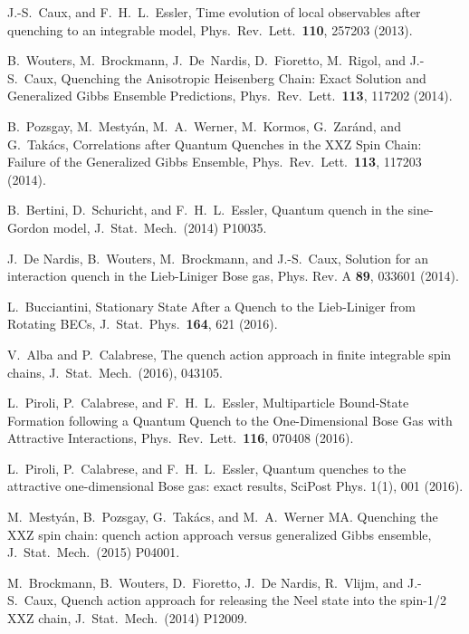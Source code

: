 \documentclass[twocolumn,superscriptaddress,prb,10pt]{revtex4-1}
\begin{document}
\begin{thebibliography}{99}
	J.-S.~Caux, and F.~H.~L.~Essler,  Time evolution of local observables 
	after quenching to an integrable model, Phys.\ Rev.\ Lett.\ {\bf 110}, 257203 (2013). 

	B.~Wouters, M.~Brockmann, J.~De~Nardis, D.~Fioretto, M.~Rigol, and J.-S.~Caux, 
	Quenching the Anisotropic Heisenberg Chain: Exact Solution and Generalized Gibbs Ensemble Predictions, 
	Phys.\ Rev.\ Lett.\ {\bf 113}, 117202 (2014).

	B.~Pozsgay, M.~Mesty\'an, M.~A.~Werner, M.~Kormos, G.~Zar\'and, and G.~Tak\'acs, 
	Correlations after Quantum Quenches in the XXZ Spin Chain: Failure of
	the Generalized Gibbs Ensemble, Phys.\ Rev.\ Lett.\ {\bf 113}, 117203 (2014).

	B.~Bertini, D.~Schuricht, and F.~H.~L.~Essler, Quantum quench in the sine-Gordon model, 
	J.\ Stat.\ Mech.\ (2014) P10035.

	J.~De Nardis, B.~Wouters, M.~Brockmann, and J.-S.~Caux, Solution for an interaction quench in the Lieb-Liniger Bose gas, 
	Phys. Rev. A {\bf 89}, 033601 (2014).

	L.~Bucciantini, Stationary State After a Quench to the Lieb-Liniger from Rotating BECs, 
	J.\ Stat.\ Phys.\ {\bf 164}, 621 (2016).


 V.~Alba and P.~Calabrese, The quench action approach in finite integrable spin chains, 
	J.\ Stat.\ Mech.\ (2016), 043105.

	L.~Piroli, P.~Calabrese, and F.~H.~L.~Essler, Multiparticle Bound-State Formation following a Quantum Quench
	to the One-Dimensional Bose Gas with Attractive Interactions, 
	Phys.\ Rev.\ Lett.\ {\bf 116}, 070408 (2016).

	L.~Piroli, P.~Calabrese, and F.~H.~L.~Essler, Quantum quenches to the attractive one-dimensional Bose gas: exact results, 
	SciPost Phys. 1(1), 001 (2016).

	M.~Mesty\'an, B.~Pozsgay, G.~Tak\'acs, and M.~A.~Werner MA.
	Quenching the XXZ spin chain: quench action approach versus generalized Gibbs ensemble, 
	J.\ Stat.\ Mech.\ (2015)  P04001.


	M.~Brockmann, B.~Wouters, D.~Fioretto, J.~De Nardis, R.~Vlijm, and J.-S.~Caux, 
	Quench action approach for releasing the Neel state into the spin-1/2 XXZ chain, 
	J.\ Stat.\ Mech.\ (2014) P12009.


\end{thebibliography}
\end{document}
